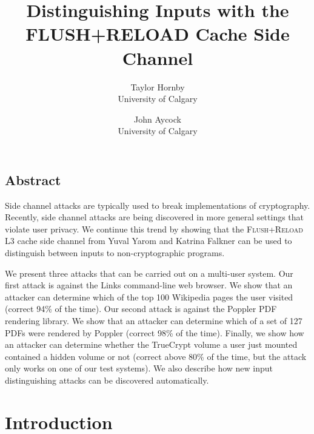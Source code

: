 \documentclass[letterpaper,twocolumn,10pt]{article}
\begin{document}
\date{}

\title{\Large \bf Distinguishing Inputs with the FLUSH+RELOAD Cache Side Channel}

\author{
{\rm Taylor Hornby}\\
University of Calgary
\and
{\rm John Aycock}\\
University of Calgary
} %

\maketitle

\thispagestyle{empty}


\subsection*{Abstract}
Side channel attacks are typically used to break implementations of
cryptography. Recently, side channel attacks are being discovered in more
general settings that violate user privacy. We continue this trend by showing
that the \textsc{Flush+Reload} L3 cache side channel from Yuval Yarom and
Katrina Falkner \cite{yarom2013flush} can be used to distinguish between inputs
to non-cryptographic programs. 

We present three attacks that can be carried out on a multi-user system. Our
first attack is against the Links command-line web browser. We show that an
attacker can determine which of the top 100 Wikipedia pages the user visited
(correct 94\% of the time). Our second attack is against the Poppler PDF
rendering library. We show that an attacker can determine which of a set of 127
PDFs were rendered by Poppler (correct 98\% of the time). Finally, we show how
an attacker can determine whether the TrueCrypt volume a user just mounted
contained a hidden volume or not (correct above 80\% of the time, but the attack
only works on one of our test systems). We also describe how new input
distinguishing attacks can be discovered automatically.

\section{Introduction}
\label{sec:intro}
\end{document}
